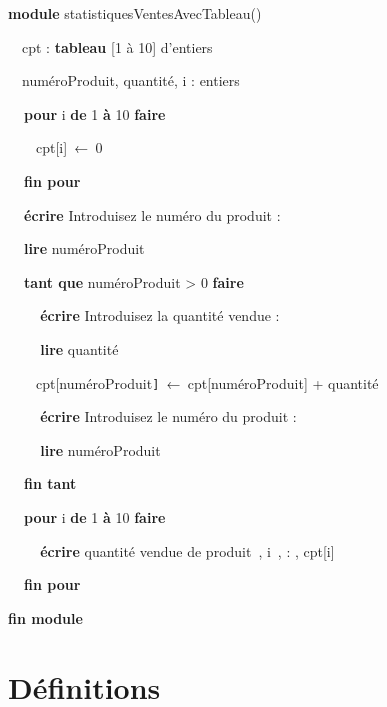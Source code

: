 {\sffamily
\textbf{module} statistiquesVentesAvecTableau()}


\bigskip

{\sffamily
\ \ cpt : \textbf{tableau} [1 à 10] d’entiers}

{\sffamily
\ \ numéroProduit, quantité, i : entiers}


\bigskip

{\sffamily
\textbf{\ \ pour} i \textbf{de} 1 \textbf{à} 10 \textbf{faire}}

{\sffamily
\ \ \ \ cpt[i]\texttt{ }←\texttt{ }0}

{\sffamily\bfseries
\ \ fin pour}


\bigskip

{\sffamily
\textbf{\ \ écrire} {\textquotedbl}Introduisez le numéro du produit :
{\textquotedbl}}

{\sffamily
\textbf{\ \ lire} numéroProduit}


\bigskip

{\sffamily
\textbf{\ \ tant que} numéroProduit {\textgreater} 0 \textbf{faire}}


\bigskip

{\sffamily
\textbf{\ \ \ \ écrire} {\textquotedbl}Introduisez la quantité vendue :
{\textquotedbl}}

{\sffamily
\textbf{\ \ \ \ lire} quantité}


\bigskip

{\sffamily
\ \ \ \ cpt[numéroProduit\texttt{] }←\texttt{ }cpt[numéroProduit] +
quantité}


\bigskip

{\sffamily
\textbf{\ \ \ \ écrire} {\textquotedbl}Introduisez le numéro du produit
: {\textquotedbl}}

{\sffamily
\textbf{\ \ \ \ lire} numéroProduit}

{\sffamily\bfseries
\ \ fin tant}


\bigskip

{\sffamily
\textbf{\ \ pour} i \textbf{de} 1 \textbf{à} 10 \textbf{faire}}

{\sffamily
\textbf{\ \ \ \ écrire} {\textquotedbl}quantité vendue de
produit~{\textquotedbl}, i~, {\textquotedbl} : {\textquotedbl}, cpt[i]}

{\sffamily\bfseries
\ \ fin pour}


\bigskip

{\sffamily\bfseries
fin module}


\bigskip

\section{Définitions}
{
}

